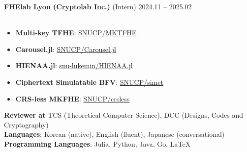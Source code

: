 \documentclass[a4paper, 10pt, twocolumn]{article}
\begin{document}
\textbf{FHElab Lyon (Cryptolab Inc.)} (Intern) \hfill 2024.11 -- 2025.02 \\
\\
\begin{itemize}
\item \textbf{Multi-key TFHE}: \href{https://github.com/SNUCP/MKTFHE}{SNUCP/MKTFHE}
\item \textbf{Carousel.jl}: \href{https://github.com/SNUCP/carousel}{SNUCP/Carousel.jl}
\item \textbf{HIENAA.jl}: \href{https://github.com/snu-lukemin/HIENAA.jl}{snu-lukemin/HIENAA.jl}
\item \textbf{Ciphertext Simulatable BFV}: \href{https://github.com/SNUCP/simct}{SNUCP/simct}
\item \textbf{CRS-less MKFHE}: \href{https://github.com/SNUCP/crslss}{SNUCP/crsless}
\end{itemize}

\textbf{Reviewer at} TCS (Theoretical Computer Science), DCC (Designs, Codes and Cryptography) \\

\textbf{Languages}: Korean (native), English (fluent), Japanese (conversational) \\
\textbf{Programming Languages}: Julia, Python, Java, Go, \LaTeX \\
\end{document}
